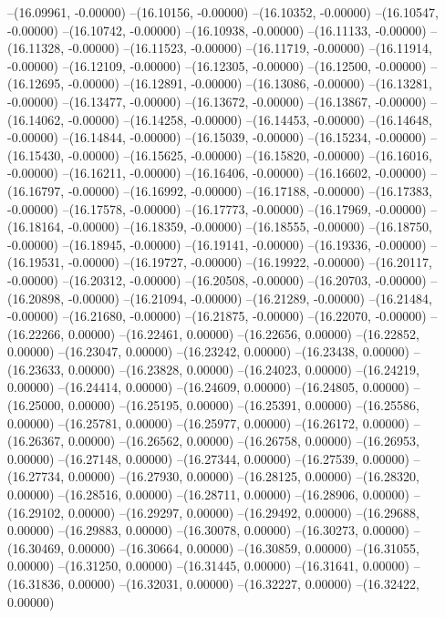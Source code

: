 --(16.09961, -0.00000)
--(16.10156, -0.00000)
--(16.10352, -0.00000)
--(16.10547, -0.00000)
--(16.10742, -0.00000)
--(16.10938, -0.00000)
--(16.11133, -0.00000)
--(16.11328, -0.00000)
--(16.11523, -0.00000)
--(16.11719, -0.00000)
--(16.11914, -0.00000)
--(16.12109, -0.00000)
--(16.12305, -0.00000)
--(16.12500, -0.00000)
--(16.12695, -0.00000)
--(16.12891, -0.00000)
--(16.13086, -0.00000)
--(16.13281, -0.00000)
--(16.13477, -0.00000)
--(16.13672, -0.00000)
--(16.13867, -0.00000)
--(16.14062, -0.00000)
--(16.14258, -0.00000)
--(16.14453, -0.00000)
--(16.14648, -0.00000)
--(16.14844, -0.00000)
--(16.15039, -0.00000)
--(16.15234, -0.00000)
--(16.15430, -0.00000)
--(16.15625, -0.00000)
--(16.15820, -0.00000)
--(16.16016, -0.00000)
--(16.16211, -0.00000)
--(16.16406, -0.00000)
--(16.16602, -0.00000)
--(16.16797, -0.00000)
--(16.16992, -0.00000)
--(16.17188, -0.00000)
--(16.17383, -0.00000)
--(16.17578, -0.00000)
--(16.17773, -0.00000)
--(16.17969, -0.00000)
--(16.18164, -0.00000)
--(16.18359, -0.00000)
--(16.18555, -0.00000)
--(16.18750, -0.00000)
--(16.18945, -0.00000)
--(16.19141, -0.00000)
--(16.19336, -0.00000)
--(16.19531, -0.00000)
--(16.19727, -0.00000)
--(16.19922, -0.00000)
--(16.20117, -0.00000)
--(16.20312, -0.00000)
--(16.20508, -0.00000)
--(16.20703, -0.00000)
--(16.20898, -0.00000)
--(16.21094, -0.00000)
--(16.21289, -0.00000)
--(16.21484, -0.00000)
--(16.21680, -0.00000)
--(16.21875, -0.00000)
--(16.22070, -0.00000)
--(16.22266, 0.00000)
--(16.22461, 0.00000)
--(16.22656, 0.00000)
--(16.22852, 0.00000)
--(16.23047, 0.00000)
--(16.23242, 0.00000)
--(16.23438, 0.00000)
--(16.23633, 0.00000)
--(16.23828, 0.00000)
--(16.24023, 0.00000)
--(16.24219, 0.00000)
--(16.24414, 0.00000)
--(16.24609, 0.00000)
--(16.24805, 0.00000)
--(16.25000, 0.00000)
--(16.25195, 0.00000)
--(16.25391, 0.00000)
--(16.25586, 0.00000)
--(16.25781, 0.00000)
--(16.25977, 0.00000)
--(16.26172, 0.00000)
--(16.26367, 0.00000)
--(16.26562, 0.00000)
--(16.26758, 0.00000)
--(16.26953, 0.00000)
--(16.27148, 0.00000)
--(16.27344, 0.00000)
--(16.27539, 0.00000)
--(16.27734, 0.00000)
--(16.27930, 0.00000)
--(16.28125, 0.00000)
--(16.28320, 0.00000)
--(16.28516, 0.00000)
--(16.28711, 0.00000)
--(16.28906, 0.00000)
--(16.29102, 0.00000)
--(16.29297, 0.00000)
--(16.29492, 0.00000)
--(16.29688, 0.00000)
--(16.29883, 0.00000)
--(16.30078, 0.00000)
--(16.30273, 0.00000)
--(16.30469, 0.00000)
--(16.30664, 0.00000)
--(16.30859, 0.00000)
--(16.31055, 0.00000)
--(16.31250, 0.00000)
--(16.31445, 0.00000)
--(16.31641, 0.00000)
--(16.31836, 0.00000)
--(16.32031, 0.00000)
--(16.32227, 0.00000)
--(16.32422, 0.00000)
